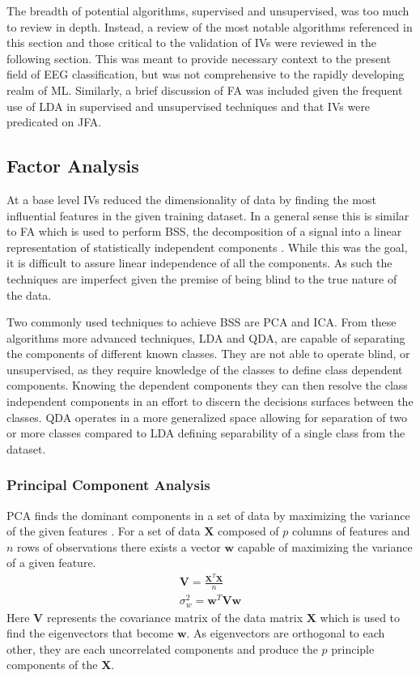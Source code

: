 The breadth of potential algorithms, supervised and unsupervised, was too much to review in depth. Instead, a review of the most notable algorithms referenced in this section and those critical to the validation of \acp{IV} were reviewed in the following section. This was meant to provide necessary context to the present field of \ac{EEG} classification, but was not comprehensive to the rapidly developing realm of \ac{ML}. Similarly, a brief discussion of \ac{FA} was included given the frequent use of \ac{LDA} in supervised and unsupervised techniques and that \acp{IV} were predicated on \ac{JFA}.

\subsection{Factor Analysis}
\label{sec:FA}

At a base level \acp{IV} reduced the dimensionality of data by finding the most influential features in the given training dataset. In a general sense this is similar to \ac{FA} which is used to perform \ac{BSS}, the decomposition of a signal into a linear representation of statistically independent components \cite{Hyvarinen2001}. While this was the goal, it is difficult to assure linear independence of all the components. As such the techniques are imperfect given the premise of being blind to the true nature of the data.

Two commonly used techniques to achieve \ac{BSS} are \ac{PCA} and \ac{ICA}. From these algorithms more advanced techniques, \ac{LDA} and \ac{QDA}, are capable of separating the components of different known classes. They are not able to operate blind, or unsupervised, as they require knowledge of the classes to define class dependent components. Knowing the dependent components they can then resolve the class independent components in an effort to discern the decisions surfaces between the classes. \ac{QDA} operates in a more generalized space allowing for separation of two or more classes compared to \ac{LDA} defining separability of a single class from the dataset. 

\subsubsection{Principal Component Analysis}

\ac{PCA} finds the dominant components in a set of data by maximizing the variance of the given features \cite{Wold1987}. For a set of data $\bm{X}$ composed of $p$ columns of features and $n$ rows of observations there exists a vector $\bm{w}$ capable of maximizing the variance of a given feature.
\begin{gather}
\bm{V}=\frac{\bm{X}^{T}\bm{X}}{n} \\
\sigma^{2}_{w}=\bm{w}^{T}\bm{V}\bm{w}
\end{gather}
Here $\bm{V}$ represents the covariance matrix of the data matrix $\bm{X}$ which is used to find the eigenvectors that become $\bm{w}$. As eigenvectors are orthogonal to each other, they are each uncorrelated components and produce the $p$ principle components of the $\bm{X}$.

